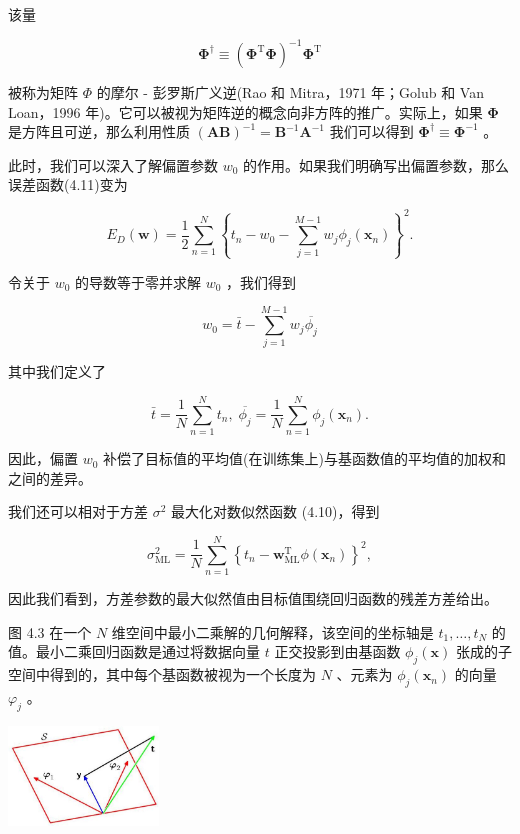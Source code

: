 \documentclass[10pt]{report}
\begin{document}
该量

\[
{\mathbf{\Phi }}^{ \dagger  } \equiv  {\left( {\mathbf{\Phi }}^{\mathrm{T}}\mathbf{\Phi }\right) }^{-1}{\mathbf{\Phi }}^{\mathrm{T}} \tag{4.16}
\]

被称为矩阵 \(\Phi\) 的摩尔 - 彭罗斯广义逆(Rao 和 Mitra，1971 年；Golub 和 Van Loan，1996 年)。它可以被视为矩阵逆的概念向非方阵的推广。实际上，如果 \(\mathbf{\Phi }\) 是方阵且可逆，那么利用性质 \({\left( \mathbf{{AB}}\right) }^{-1} = {\mathbf{B}}^{-1}{\mathbf{A}}^{-1}\) 我们可以得到 \({\mathbf{\Phi }}^{ \dagger  } \equiv  {\mathbf{\Phi }}^{-1}\) 。

此时，我们可以深入了解偏置参数 \({w}_{0}\) 的作用。如果我们明确写出偏置参数，那么误差函数(4.11)变为

\[
{E}_{D}\left( \mathbf{w}\right)  = \frac{1}{2}\mathop{\sum }\limits_{{n = 1}}^{N}{\left\{  {t}_{n} - {w}_{0} - \mathop{\sum }\limits_{{j = 1}}^{{M - 1}}{w}_{j}{\phi }_{j}\left( {\mathbf{x}}_{n}\right) \right\}  }^{2}. \tag{4.17}
\]

令关于 \({w}_{0}\) 的导数等于零并求解 \({w}_{0}\) ，我们得到

\[
{w}_{0} = \bar{t} - \mathop{\sum }\limits_{{j = 1}}^{{M - 1}}{w}_{j}\overline{{\phi }_{j}} \tag{4.18}
\]

其中我们定义了

\[
\bar{t} = \frac{1}{N}\mathop{\sum }\limits_{{n = 1}}^{N}{t}_{n},\;\overline{{\phi }_{j}} = \frac{1}{N}\mathop{\sum }\limits_{{n = 1}}^{N}{\phi }_{j}\left( {\mathbf{x}}_{n}\right) . \tag{4.19}
\]

因此，偏置 \({w}_{0}\) 补偿了目标值的平均值(在训练集上)与基函数值的平均值的加权和之间的差异。

我们还可以相对于方差 \({\sigma }^{2}\) 最大化对数似然函数 (4.10)，得到

\[
{\sigma }_{\mathrm{{ML}}}^{2} = \frac{1}{N}\mathop{\sum }\limits_{{n = 1}}^{N}{\left\{  {t}_{n} - {\mathbf{w}}_{\mathrm{{ML}}}^{\mathrm{T}}\phi \left( {\mathbf{x}}_{n}\right) \right\}  }^{2}, \tag{4.20}
\]

因此我们看到，方差参数的最大似然值由目标值围绕回归函数的残差方差给出。

图 4.3 在一个 \(N\) 维空间中最小二乘解的几何解释，该空间的坐标轴是 \({t}_{1},\ldots ,{t}_{N}\) 的值。最小二乘回归函数是通过将数据向量 \(t\) 正交投影到由基函数 \({\phi }_{j}\left( \mathbf{x}\right)\) 张成的子空间中得到的，其中每个基函数被视为一个长度为 \(N\) 、元素为 \({\phi }_{j}\left( {\mathbf{x}}_{n}\right)\) 的向量 \({\varphi }_{j}\) 。

\begin{center}
\includegraphics[max width=0.3\textwidth]{images/0194e279-9b28-703a-88f4-c3ac21e2010d_136_1070_347_483_322_0.jpg}
\end{center}
\hspace*{3em} 
\end{document}
